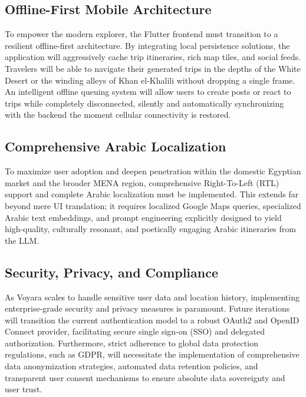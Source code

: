 \subsection{Offline-First Mobile Architecture}
To empower the modern explorer, the Flutter frontend must transition to a resilient offline-first architecture. By integrating local persistence solutions, the application will aggressively cache trip itineraries, rich map tiles, and social feeds. Travelers will be able to navigate their generated trips in the depths of the White Desert or the winding alleys of Khan el-Khalili without dropping a single frame. An intelligent offline queuing system will allow users to create posts or react to trips while completely disconnected, silently and automatically synchronizing with the backend the moment cellular connectivity is restored.

\subsection{Comprehensive Arabic Localization}
To maximize user adoption and deepen penetration within the domestic Egyptian market and the broader MENA region, comprehensive Right-To-Left (RTL) support and complete Arabic localization must be implemented. This extends far beyond mere UI translation; it requires localized Google Maps queries, specialized Arabic text embeddings, and prompt engineering explicitly designed to yield high-quality, culturally resonant, and poetically engaging Arabic itineraries from the LLM.

\subsection{Security, Privacy, and Compliance}
As Voyara scales to handle sensitive user data and location history, implementing enterprise-grade security and privacy measures is paramount. Future iterations will transition the current authentication model to a robust OAuth2 and OpenID Connect provider, facilitating secure single sign-on (SSO) and delegated authorization. Furthermore, strict adherence to global data protection regulations, such as GDPR, will necessitate the implementation of comprehensive data anonymization strategies, automated data retention policies, and transparent user consent mechanisms to ensure absolute data sovereignty and user trust.

